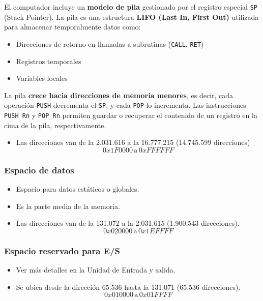 \documentclass{article}
\begin{document}
El computador incluye un \textbf{modelo de pila} gestionado por el registro especial \texttt{SP} (Stack Pointer). La pila es una estructura \textbf{LIFO (Last In, First Out)} utilizada para almacenar temporalmente datos como:

\begin{itemize}
    \item Direcciones de retorno en llamadas a subrutinas (\texttt{CALL}, \texttt{RET})
    \item Registros temporales
    \item Variables locales
\end{itemize}

La pila \textbf{crece hacia direcciones de memoria menores}, es decir, cada operación \texttt{PUSH} decrementa el \texttt{SP}, y cada \texttt{POP} lo incrementa. Las instrucciones \texttt{PUSH Rn} y \texttt{POP Rn} permiten guardar o recuperar el contenido de un registro en la cima de la pila, respectivamente.

\begin{itemize}
    \item Las direcciones van de la 2.031.616 a la 16.777.215 (14.745.599 direcciones)
    \[
    0x1F0000 \, \text{a} \, 0xFFFFFF
    \]
\end{itemize}

\subsubsection{Espacio de datos}

\begin{itemize}
    \item Espacio para datos estáticos o globales.
    \item Es la parte media de la memoria.
    \item Las direcciones van de la 131.072 a la 2.031.615 (1.900.543 direcciones).
    \[
    0x020000 \, \text{a} \, 0x1EFFFF
    \]
\end{itemize}

\subsubsection{Espacio reservado para E/S}

\begin{itemize}
    \item Ver más detalles en la Unidad de Entrada y salida.
    \item Se ubica desde la dirección 65.536 hasta la 131.071 (65.536 direcciones).
    \[
    0x010000 \, \text{a} \, 0x01FFFF
    \]
\end{itemize}
\end{document}
